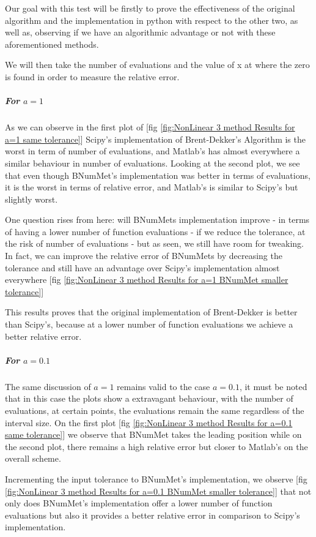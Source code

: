Our goal with this test will be firstly to prove the effectiveness of the original algorithm and the implementation in python with respect to the other two, as well as, observing if we have an algorithmic advantage or not with these aforementioned methods.

We will then take the number of evaluations and the value of x at where the zero is found in order to measure the relative error.

\subparagraph{For $a=1$}
As we can observe in the first plot of [fig \ref{fig:NonLinear 3 method Results for a=1 same tolerance}] Scipy's implementation of Brent-Dekker's Algorithm is the worst in term of number of evaluations, and Matlab's has almost everywhere a similar behaviour in number of evaluations. Looking at the second plot, we see that even though BNumMet's implementation was better in terms of evaluations, it is the worst in terms of relative error, and Matlab's is similar to Scipy's but slightly worst.

One question rises from here: will BNumMets implementation improve - in terms of having a lower number of function evaluations - if we reduce the tolerance, at the risk of number of evaluations - but as seen, we still have room for tweaking. In fact, we can improve the relative error of BNumMets by decreasing the tolerance and still have an advantage over Scipy's implementation almost everywhere [fig \ref{fig:NonLinear 3 method Results for a=1 BNumMet smaller tolerance}]

This results proves that the original implementation of Brent-Dekker is better than Scipy's, because at a lower number of function evaluations we achieve a better relative error. 

\subparagraph{For $a=0.1$}
The same discussion of $a=1$ remains valid to the case $a=0.1$, it must be noted that in this case the plots show a extravagant behaviour, with the number of evaluations, at certain points, the evaluations remain the same regardless of the interval size. On the first plot [fig \ref{fig:NonLinear 3 method Results for a=0.1 same tolerance}] we observe that BNumMet takes the leading position while on the second plot, there remains a high relative error but closer to Matlab's on the overall scheme.

Incrementing the input tolerance to BNumMet's implementation, we observe [fig \ref{fig:NonLinear 3 method Results for a=0.1 BNumMet smaller tolerance}] that not only does BNumMet's implementation offer a lower number of function evaluations but also it provides a better relative error in comparison to Scipy's implementation.

